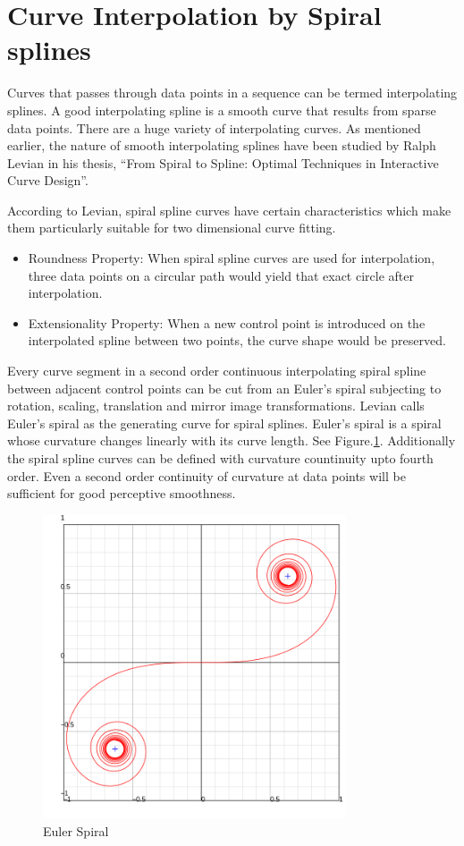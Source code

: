 \documentclass[10pt]{article}
\begin{document}
\section{Curve Interpolation by Spiral splines}

Curves that passes through data points in a sequence can be termed interpolating splines. A good interpolating spline is a smooth curve that results from sparse data points. There are a huge variety  of interpolating curves. As mentioned earlier, the nature of smooth interpolating splines have been studied by Ralph Levian in his thesis, “From Spiral to Spline: Optimal Techniques in Interactive Curve Design”\cite{levian}.

According to Levian, spiral spline curves have certain characteristics which make them particularly suitable for two dimensional curve fitting.
\begin{itemize}
	\item Roundness Property:  When spiral spline curves are used for interpolation, three data points on a circular path would yield that exact circle after interpolation.
	\item Extensionality Property: When a new control point is introduced on the interpolated spline between two points, the curve shape would be preserved.
\end{itemize}

Every curve segment in a second order continuous interpolating spiral spline between adjacent control points can be cut from an Euler’s spiral subjecting to rotation, scaling, translation and mirror image transformations. Levian calls Euler’s spiral as the generating curve for spiral splines. Euler’s spiral is a spiral whose curvature changes linearly with its curve length. See Figure.\ref{eulerspiral}. Additionally the spiral spline curves can be defined with curvature countinuity upto fourth order. Even a second order continuity of curvature at data points will be sufficient for good perceptive smoothness.



\begin{figure}
	\centering
	\includegraphics[width=0.8\textwidth]{images/Euler_spiral.png}
	\caption{Euler Spiral}
	\label{eulerspiral}
\end{figure}
\end{document}
